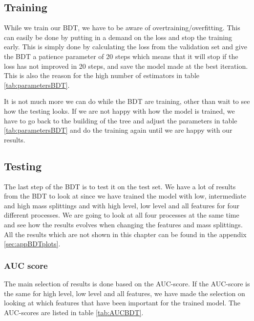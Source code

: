 \subsection{Training}
While we train our BDT, we have to be aware of overtraining/overfitting. This can easily be done by putting in a demand on the loss and stop the training early. This is simply done by calculating the loss from the validation set and give the BDT a patience parameter of 20 steps which means that it will stop if the loss has not improved in 20 steps, and save the model made at the best iteration. This is also the reason for the high number of estimators in table \ref{tab:parametersBDT}.

It is not much more we can do while the BDT are training, other than wait to see how the testing looks. If we are not happy with how the model is trained, we have to go back to the building of the tree and adjust the parameters in table \ref{tab:parametersBDT} and do the training again until we are happy with our results.

\subsection{Testing}
The last step of the BDT is to test it on the test set. We have a lot of results from the BDT to look at since we have trained the model with low, intermediate and high mass splittings and with high level, low level and all features for four different processes. We are going to look at all four processes at the same time and see how the results evolves when changing the features and mass splittings. All the results which are not shown in this chapter can be found in the appendix \ref{sec:appBDTplots}. 

\subsubsection{AUC score}
The main selection of results is done based on the AUC-score. If the AUC-score is the same for high level, low level and all features, we have made the selection on looking at which features that have been important for the trained model. The AUC-scores are listed in table \ref{tab:AUCBDT}. 

